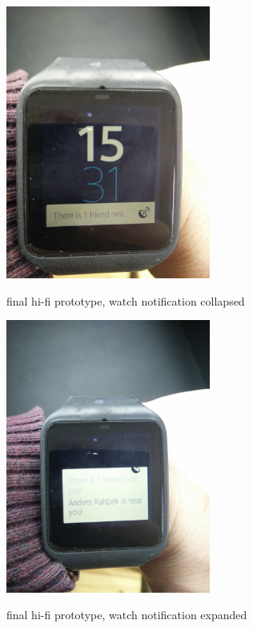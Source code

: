 \documentclass[runningheads,a4paper]{llncs}
\begin{document}
\begin{figure}
\centering
\caption{final hi-fi prototype, watch notification collapsed}
\includegraphics[width=0.6\textwidth]{figures/hi-fi-watch-collapsed}
\label{fig:hi-fi watch notification expanded}
\end{figure}

\begin{figure}
\centering
\caption{final hi-fi prototype, watch notification expanded}
\includegraphics[width=0.6\textwidth]{figures/hi-fi-watch-expanded}
\label{fig:hi-fi watch notification expanded}
\end{figure}
\end{document}
